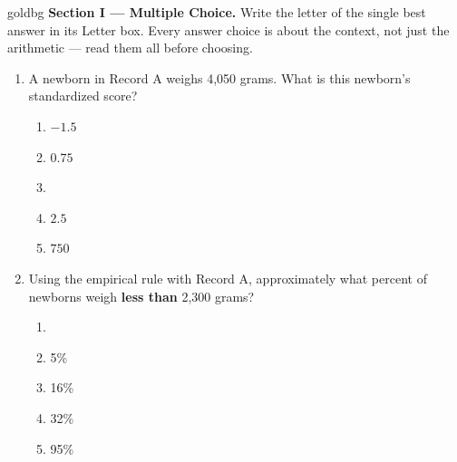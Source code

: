 \vspace{0.14in}

\boxguard[16]
\begin{headlinebox}{goldbg}
\small
\textbf{Section I --- Multiple Choice.} Write the letter of the single best answer in its Letter box. Every answer choice is
about the context, not just the arithmetic --- read them all before choosing.
\end{headlinebox}

\vspace{0.10in}

\begin{enumerate}[leftmargin=1.9em, itemsep=0.13in]

  \item A newborn in Record A weighs 4,050 grams. What is this newborn's standardized score?
        \begin{enumerate}[label=\textbf{(\Alph*)}, leftmargin=2.2em, itemsep=2pt]
          \item $-1.5$
          \item $0.75$
          \item {}
          \item $2.5$
          \item $750$
                \hfill{}
        \end{enumerate}

  \item Using the empirical rule with Record A, approximately what percent of newborns weigh
        \textbf{less than} 2,300 grams?
        \begin{enumerate}[label=\textbf{(\Alph*)}, leftmargin=2.2em, itemsep=2pt]
          \item {}
          \item 5\%
          \item 16\%
          \item 32\%
          \item 95\%
                \hfill{}
        \end{enumerate}


\end{enumerate}
